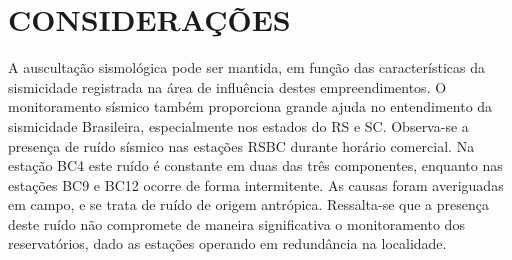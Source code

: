 \section{CONSIDERAÇÕES}
A auscultação sismológica pode ser mantida, em função das características da sismicidade registrada na área de influência destes empreendimentos. O monitoramento sísmico também proporciona grande ajuda no entendimento da sismicidade Brasileira, especialmente nos estados do RS e SC.
Observa-se a presença de ruído sísmico nas estações RSBC durante horário comercial.  Na estação BC4 este ruído é constante em duas das três componentes, enquanto nas estações BC9 e BC12 ocorre de forma intermitente. As causas foram averiguadas em campo, e se trata de ruído de origem antrópica. Ressalta-se que a presença deste ruído não compromete de maneira significativa o monitoramento dos reservatórios, dado as estações operando em redundância na localidade.
